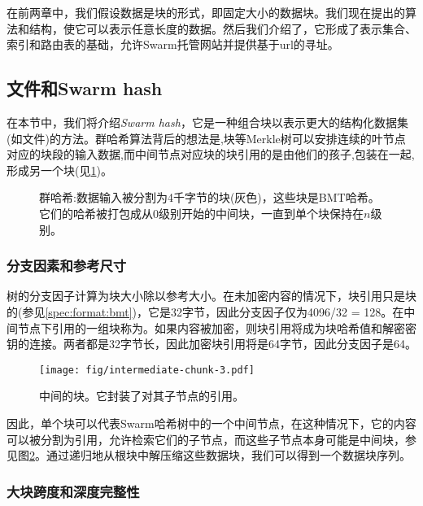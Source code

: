 \green{}

在前两章中，我们假设数据是块的形式，即固定大小的数据块。我们现在提出的算法和结构，使它可以表示任意长度的数据。然后我们介绍了，它形成了表示集合、索引和路由表的基础，允许Swarm托管网站并提供基于url的寻址。

\subsection{文件和Swarm hash\statusgreen}\label{sec:files}

在本节中，我们将介绍\emph{Swarm hash}，它是一种组合块以表示更大的结构化数据集(如文件)的方法。群哈希算法背后的想法是,块等Merkle树可以安排连续的叶节点对应的块段的输入数据,而中间节点对应块的块引用的是由他们的孩子,包装在一起,形成另一个块(见\ref{fig:Swarm-hash})。 



\begin{figure}[htbp]
\centering
\resizebox{1\textwidth}{!}{
    
}
\caption[群哈希\statusgreen]{群哈希:数据输入被分割为4千字节的块(灰色)，这些块是BMT哈希。它们的哈希被打包成从$0$级别开始的中间块，一直到单个块保持在$n$级别。 }
\label{fig:Swarm-hash}
\end{figure}

\subsubsection{分支因素和参考尺寸}

树的分支因子计算为块大小除以参考大小。在未加密内容的情况下，块引用只是块的(参见\ref{spec:format:bmt})，它是32字节，因此分支因子仅为4096/32 = 128。在中间节点下引用的一组块称为。如果内容被加密，则块引用将成为块哈希值和解密密钥的连接。两者都是32字节长，因此加密块引用将是64字节，因此分支因子是64。 


\begin{figure}[htbp]
\centering
\texttt{[image: fig/intermediate-chunk-3.pdf]}
\caption[中间块\statusgreen]{中间的块。它封装了对其子节点的引用。}
\label{fig:intermediate-chunk}
\end{figure}

因此，单个块可以代表Swarm哈希树中的一个中间节点，在这种情况下，它的内容可以被分割为引用，允许检索它们的子节点，而这些子节点本身可能是中间块，参见图\ref{fig:intermediate-chunk}。通过递归地从根块中解压缩这些数据块，我们可以得到一个数据块序列。 

 \subsubsection{大块跨度和深度完整性}

